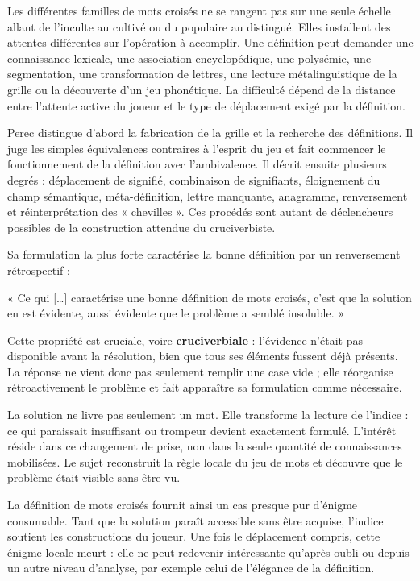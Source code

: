 \documentclass[10pt,a4paper]{article}
\begin{document}
Les différentes familles de mots croisés ne se rangent pas sur une seule échelle allant de l'inculte au cultivé ou du populaire au distingué. Elles installent des attentes différentes sur l'opération à accomplir. Une définition peut demander une connaissance lexicale, une association encyclopédique, une polysémie, une segmentation, une transformation de lettres, une lecture métalinguistique de la grille ou la découverte d'un jeu phonétique. La difficulté dépend de la distance entre l'attente active du joueur et le type de déplacement exigé par la définition.

Perec distingue d'abord la fabrication de la grille et la recherche des définitions. Il juge les simples équivalences contraires à l'esprit du jeu et fait commencer le fonctionnement de la définition avec l'ambivalence. Il décrit ensuite plusieurs degrés : déplacement de signifié, combinaison de signifiants, éloignement du champ sémantique, méta-définition, lettre manquante, anagramme, renversement et réinterprétation des « chevilles ». Ces procédés sont autant de déclencheurs possibles de la construction attendue du cruciverbiste.

Sa formulation la plus forte caractérise la bonne définition par un renversement rétrospectif :

« Ce qui […] caractérise une bonne définition de mots croisés, c’est que la solution en est évidente, aussi évidente que le problème a semblé insoluble. »

Cette propriété est cruciale, voire \textbf{cruciverbiale} : l'évidence n'était pas disponible avant la résolution, bien que tous ses éléments fussent déjà présents. La réponse ne vient donc pas seulement remplir une case vide ; elle réorganise rétroactivement le problème et fait apparaître sa formulation comme nécessaire.

La solution ne livre pas seulement un mot. Elle transforme la lecture de l'indice : ce qui paraissait insuffisant ou trompeur devient exactement formulé. L'intérêt réside dans ce changement de prise, non dans la seule quantité de connaissances mobilisées. Le sujet reconstruit la règle locale du jeu de mots et découvre que le problème était visible sans être vu.

La définition de mots croisés fournit ainsi un cas presque pur d'énigme consumable. Tant que la solution paraît accessible sans être acquise, l'indice soutient les constructions du joueur. Une fois le déplacement compris, cette énigme locale meurt : elle ne peut redevenir intéressante qu'après oubli ou depuis un autre niveau d'analyse, par exemple celui de l'élégance de la définition.
\end{document}
